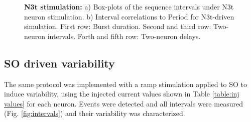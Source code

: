 \begin{figure}[hbt!]
\begin{minipage}[b]{0.53\textwidth}
\begin{minipage}[b]{\textwidth}
		\end{minipage}
	\end{minipage}
	\caption{\textbf{N3t stimulation:} a) Box-plots of the sequence intervals under N3t neuron stimulation. b) Interval correlations to Period for N3t-driven simulation. First row: Burst duration. Second and third row: Two-neuron intervals. Forth and fifth row: Two-neuron delays.}
	\label{fig:invariants n3t}
\end{figure}





\subsection{SO driven variability}
\label{subsec:so driven}

The same protocol was implemented with a ramp stimulation applied to SO to induce variability, using the injected current values shown in Table \ref{table:inj values} for each neuron. Events were detected and all intervals were measured (Fig. \ref{fig:intervals}) and their variability was characterized. %


